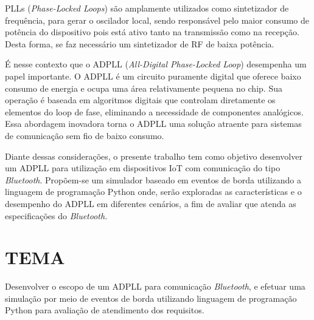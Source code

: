 PLLs (\textit{Phase-Locked Loops}) são amplamente utilizados como sintetizador de frequência, para gerar o oscilador local, sendo responsável pelo maior consumo de potência do dispositivo pois está ativo tanto na transmissão como na recepção. Desta forma, se faz necessário um sintetizador de RF de baixa potência.

É nesse contexto que o ADPLL (\textit{All-Digital Phase-Locked Loop}) desempenha um papel importante. O ADPLL é um circuito puramente digital que oferece baixo consumo de energia e ocupa uma área relativamente pequena no chip. Sua operação é baseada em algoritmos digitais que controlam diretamente os elementos do loop de fase, eliminando a necessidade de componentes analógicos. Essa abordagem inovadora torna o ADPLL uma solução atraente para sistemas de comunicação sem fio de baixo consumo.

Diante dessas considerações, o presente trabalho tem como objetivo desenvolver um ADPLL para utilização em dispositivos IoT com comunicação do tipo \textit{Bluetooth}.  Propõem-se um simulador baseado em eventos de borda utilizando a linguagem de programação Python onde, serão exploradas as características e o desempenho do ADPLL em diferentes cenários, a fim de avaliar que atenda as especificações do \textit{Bluetooth}.




\section{TEMA} 

Desenvolver o escopo de um ADPLL para comunicação \textit{Bluetooth}, e efetuar uma simulação por meio de eventos de borda utilizando linguagem de programação Python para avaliação de atendimento dos requisitos.

